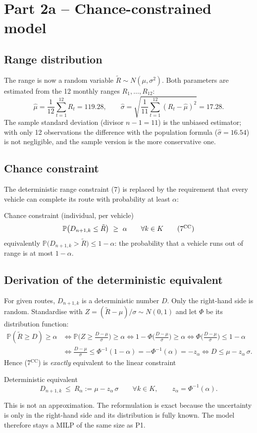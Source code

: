 \documentclass[11pt,a4paper]{article}
\theoremstyle{definition}
\begin{document}
\section{Part 2a -- Chance-constrained model}
\subsection{Range distribution}
The range is now a random variable $\tilde R\sim N(\mu,\sigma^2)$. Both parameters are estimated from the 12 monthly ranges $R_1,\dots,R_{12}$:
\[
\hat\mu=\frac1{12}\sum_{t=1}^{12}R_t=119.28,\qquad
\hat\sigma=\sqrt{\frac1{11}\sum_{t=1}^{12}(R_t-\hat\mu)^2}=17.28 .
\]
The sample standard deviation (divisor $n-1=11$) is the unbiased estimator; with only 12 observations the difference with the population formula ($\hat\sigma=16.54$) is not negligible, and the sample version is the more conservative one.

\subsection{Chance constraint}
The deterministic range constraint (7) is replaced by the requirement that every vehicle can complete its route with probability at least $\alpha$:
\begin{modelbox}{Chance constraint (individual, per vehicle)}
\[
\mathbb P\big(D_{n+1,k}\le\tilde R\big)\ \ge\ \alpha\qquad\forall k\in K \tag{7$^{\mathrm{CC}}$}
\]
equivalently $\mathbb P\big(D_{n+1,k}>\tilde R\big)\le 1-\alpha$: the probability that a vehicle runs out of range is at most $1-\alpha$.
\end{modelbox}

\subsection{Derivation of the deterministic equivalent}
For given routes, $D_{n+1,k}$ is a deterministic number $D$. Only the right-hand side is random. Standardise with $Z=(\tilde R-\mu)/\sigma\sim N(0,1)$ and let $\Phi$ be its distribution function:
\begin{align*}
\mathbb P(\tilde R\ge D)\ge\alpha
&\iff \mathbb P\Big(Z\ge \tfrac{D-\mu}{\sigma}\Big)\ge\alpha
\iff 1-\Phi\Big(\tfrac{D-\mu}{\sigma}\Big)\ge\alpha
\iff \Phi\Big(\tfrac{D-\mu}{\sigma}\Big)\le 1-\alpha\\
&\iff \tfrac{D-\mu}{\sigma}\le \Phi^{-1}(1-\alpha)=-\Phi^{-1}(\alpha)=-z_\alpha
\iff D\le \mu-z_\alpha\,\sigma .
\end{align*}
Hence (7$^{\mathrm{CC}}$) is \emph{exactly} equivalent to the linear constraint
\begin{modelbox}{Deterministic equivalent}
\[
D_{n+1,k}\ \le\ R_\alpha:=\mu-z_\alpha\,\sigma\qquad\forall k\in K,\qquad z_\alpha=\Phi^{-1}(\alpha). \tag{7$'$}
\]
\end{modelbox}
This is not an approximation. The reformulation is exact because the uncertainty is only in the right-hand side and its distribution is fully known. The model therefore stays a MILP of the same size as P1.
\end{document}
